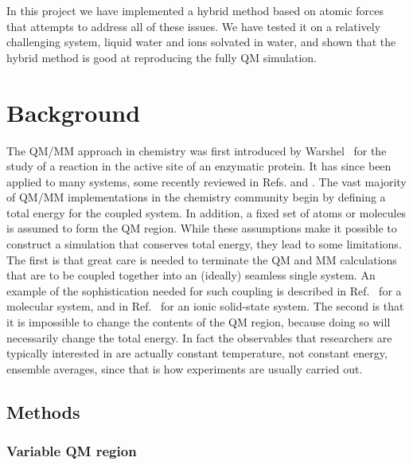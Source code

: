 \documentclass[11pt]{revtex4}
\begin{document}
In this project we have implemented a hybrid method based on atomic
forces that attempts to address all of these issues.  We have tested
it on a relatively challenging system, liquid water and ions solvated
in water, and shown that the hybrid method is good at reproducing
the fully QM simulation.

\section{Background}

The QM/MM approach in chemistry was first introduced by
Warshel~\cite{warshel_j_mol_biol_1976a} for the study of a reaction
in the active site of an enzymatic protein.  It has since been
applied to many systems, some recently reviewed in
Refs. and
.  The vast majority of QM/MM
implementations in the chemistry community begin by defining a total
energy for the coupled system.  In addition, a fixed set of atoms
or molecules is assumed to form the QM region.  While these assumptions
make it possible to construct a simulation that conserves total
energy, they lead to some limitations.  The first is that great
care is needed to terminate the QM and MM calculations that are to
be coupled together into an (ideally) seamless single system.  An
example of the sophistication needed for such coupling is described
in Ref.~ for a molecular system, and in
Ref.~ for an ionic solid-state
system.  The second is that it is impossible to change the contents
of the QM region, because doing so will necessarily change the total
energy.  In fact the observables that researchers are typically
interested in are actually constant temperature, not constant energy,
ensemble averages, since that is how experiments are usually carried
out.

\subsection{Methods}

\subsubsection{Variable QM region}
\end{document}
